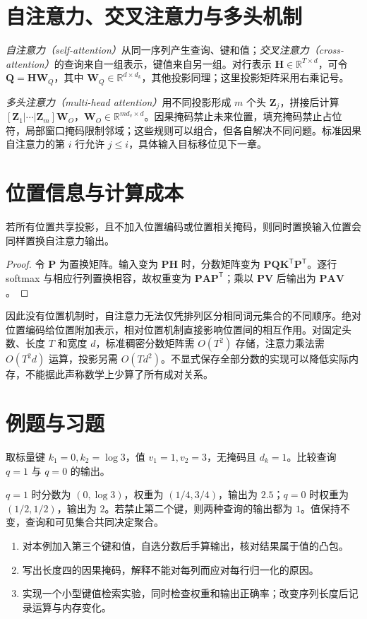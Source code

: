 \section{自注意力、交叉注意力与多头机制}
\emph{自注意力（self-attention）}从同一序列产生查询、键和值；\emph{交叉注意力（cross-attention）}的查询来自一组表示，键值来自另一组。对行表示 $\mathbf H\in\mathbb R^{T\times d}$，可令 $\mathbf Q=\mathbf H\mathbf W_Q$，其中 $\mathbf W_Q\in\mathbb R^{d\times d_k}$，其他投影同理；这里投影矩阵采用右乘记号。

\emph{多头注意力（multi-head attention）}用不同投影形成 $m$ 个头 $\mathbf Z_j$，拼接后计算 $[\mathbf Z_1|\cdots|\mathbf Z_m]\mathbf W_O$，$\mathbf W_O\in\mathbb R^{md_v\times d}$。因果掩码禁止未来位置，填充掩码禁止占位符，局部窗口掩码限制邻域；这些规则可以组合，但各自解决不同问题。标准因果自注意力的第 $i$ 行允许 $j\leq i$，具体输入目标移位见下一章。

\section{位置信息与计算成本}
\begin{proposition}[无位置自注意力的置换等变性]
若所有位置共享投影，且不加入位置编码或位置相关掩码，则同时置换输入位置会同样置换自注意力输出。
\end{proposition}
\begin{proof}
令 $\mathbf P$ 为置换矩阵。输入变为 $\mathbf P\mathbf H$ 时，分数矩阵变为 $\mathbf P\mathbf Q\mathbf K^\mathsf T\mathbf P^\mathsf T$。逐行 softmax 与相应行列置换相容，故权重变为 $\mathbf P\mathbf A\mathbf P^\mathsf T$；乘以 $\mathbf P\mathbf V$ 后输出为 $\mathbf P\mathbf A\mathbf V$。
\end{proof}
因此没有位置机制时，自注意力无法仅凭排列区分相同词元集合的不同顺序。绝对位置编码给位置附加表示，相对位置机制直接影响位置间的相互作用。对固定头数、长度 $T$ 和宽度 $d$，标准稠密分数矩阵需 $O(T^2)$ 存储，注意力乘法需 $O(T^2d)$ 运算，投影另需 $O(Td^2)$。不显式保存全部分数的实现可以降低实际内存，不能据此声称数学上少算了所有成对关系。

\section{例题与习题}
\begin{example}[查询改变加权平均]
取标量键 $k_1=0,k_2=\log3$，值 $v_1=1,v_2=3$，无掩码且 $d_k=1$。比较查询 $q=1$ 与 $q=0$ 的输出。
\end{example}
\begin{solve}
$q=1$ 时分数为 $(0,\log3)$，权重为 $(1/4,3/4)$，输出为 $2.5$；$q=0$ 时权重为 $(1/2,1/2)$，输出为 $2$。若禁止第二个键，则两种查询的输出都为 $1$。值保持不变，查询和可见集合共同决定聚合。
\end{solve}
\begin{enumerate}
\item 对本例加入第三个键和值，自选分数后手算输出，核对结果属于值的凸包。
\item 写出长度四的因果掩码，解释不能对每列而应对每行归一化的原因。
\item 实现一个小型键值检索实验，同时检查权重和输出正确率；改变序列长度后记录运算与内存变化。
\end{enumerate}

